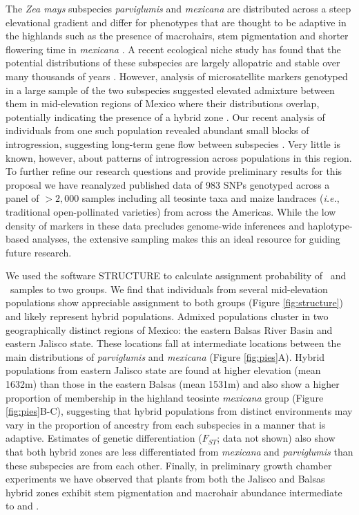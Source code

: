 The \emph {Zea mays} subspecies \emph{parviglumis} and \emph{mexicana} are distributed across a steep elevational gradient and differ for phenotypes that are thought to be adaptive in the highlands such as the presence of macrohairs, stem pigmentation and shorter flowering time in \emph{mexicana} \citep{wilkes1967teosinte}.
A recent ecological niche study has found that the potential distributions of these subspecies are largely allopatric and stable over many thousands of years \citep{hufford2012inferences}.
However, analysis of microsatellite markers genotyped in a large sample of the two subspecies suggested elevated admixture between them in mid-elevation regions of Mexico where their distributions overlap, potentially indicating the presence of a hybrid zone \citep{Fukunaga2005}.  
Our recent analysis of individuals from one such population revealed abundant small blocks of introgression, suggesting long-term gene flow between subspecies \citep{Pyhajarvi2013}.  
Very little is known, however, about patterns of introgression across populations in this region.
To further refine our research questions and provide preliminary results for this proposal we have reanalyzed published data \citep{Fang2012} of 983 SNPs genotyped across a panel of $>2,000$ samples including all teosinte taxa and maize landraces (\emph{i.e.}, traditional open-pollinated varieties) from across the Americas.
While the low density of markers in these data precludes genome-wide inferences and haplotype-based analyses, the extensive sampling makes this an ideal resource for guiding future research.

We used the software STRUCTURE \citep{Pritchard2000} to calculate assignment probability of \zp\ and \zm\ samples to two groups.  
We find that individuals from several mid-elevation populations show appreciable assignment to both groups (Figure \ref{fig:structure}) and likely represent hybrid populations.  
Admixed populations cluster in two geographically distinct regions of Mexico: the eastern Balsas River Basin and eastern Jalisco state.
These locations fall at intermediate locations between the main distributions of \emph{parviglumis} and \emph{mexicana} (Figure \ref{fig:pies}A).
Hybrid populations from eastern Jalisco state are found at higher elevation (mean 1632m) than those in the eastern Balsas (mean 1531m) and also show a higher proportion of membership in the highland teosinte \emph{mexicana} group (Figure \ref{fig:pies}B-C), suggesting that hybrid populations from distinct environments may vary in the proportion of ancestry from each subspecies in a manner that is adaptive.
Estimates of genetic differentiation ($F_{ST}$; data not shown) also show that both hybrid zones are less differentiated from \emph{mexicana} and \emph{parviglumis} than these subspecies are from each other.
Finally, in preliminary growth chamber experiments we have observed that plants from both the Jalisco and Balsas hybrid zones exhibit stem pigmentation and macrohair abundance intermediate to \zp{} and \zm{}.

